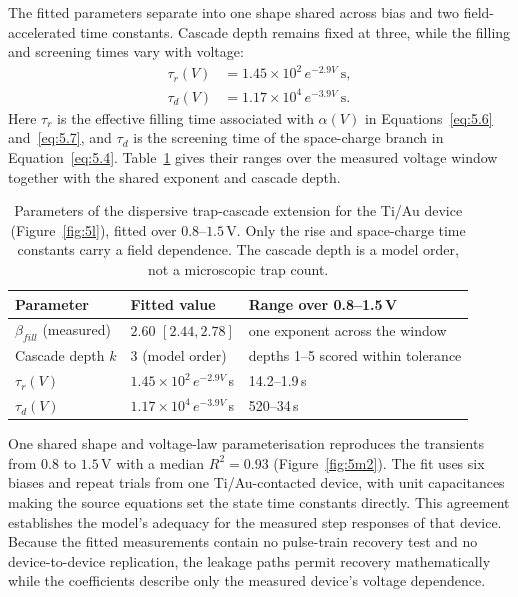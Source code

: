 \noindent The fitted parameters separate into one shape shared across bias and two field-accelerated time constants.
Cascade depth remains fixed at three, while the filling and screening times vary with voltage:
\begin{align}
\tau_r(V) &= 1.45 \times 10^{2}\, e^{-2.9V}\ \mathrm{s}, \label{eq:5.8} \\
\tau_d(V) &= 1.17 \times 10^{4}\, e^{-3.9V}\ \mathrm{s}. \label{eq:5.9}
\end{align}
Here $\tau_r$ is the effective filling time associated with $\alpha(V)$ in
Equations~\ref{eq:5.6} and~\ref{eq:5.7}, and $\tau_d$ is the screening time of the space-charge branch in
Equation~\ref{eq:5.4}. Table~\ref{table:5c} gives their ranges over the measured voltage window together with the
shared exponent and cascade depth.\\

\begin{table}[ht]
    \caption[Parameters of the dispersive trap-cascade extension.]{Parameters of the dispersive trap-cascade extension for the Ti/Au device
    (Figure~\ref{fig:5l}), fitted over $0.8$--$1.5$\,V. Only the rise and space-charge time constants carry a field
    dependence. The cascade depth is a model order, not a microscopic trap count.}
    \label{table:5c}
    \centering
    \footnotesize
    \begin{tabular}{@{}l l l@{}}
    \toprule
    Parameter & Fitted value & Range over 0.8--1.5\,V \\
    \midrule
    $\beta_{fill}$ (measured) & $2.60$ $[2.44, 2.78]$          & one exponent across the window \\
    Cascade depth $k$        & 3 (model order)                & depths 1--5 scored within tolerance \\
    $\tau_r(V)$    & $1.45 \times 10^{2}\, e^{-2.9V}$\,s       & 14.2--1.9\,s \\
    $\tau_d(V)$    & $1.17 \times 10^{4}\, e^{-3.9V}$\,s       & 520--34\,s \\
    \bottomrule
    \end{tabular}
\end{table}

\noindent One shared shape and voltage-law parameterisation reproduces the transients from $0.8$ to $1.5$\,V with a
median $R^2=0.93$ (Figure~\ref{fig:5m2}). The fit uses six biases and repeat trials from one Ti/Au-contacted device,
with unit capacitances making the source equations set the state time constants directly. This agreement establishes
the model's adequacy for the measured step responses of that device. Because the fitted measurements contain no
pulse-train recovery test and no device-to-device replication, the leakage paths permit recovery mathematically while
the coefficients describe only the measured device's voltage dependence.

